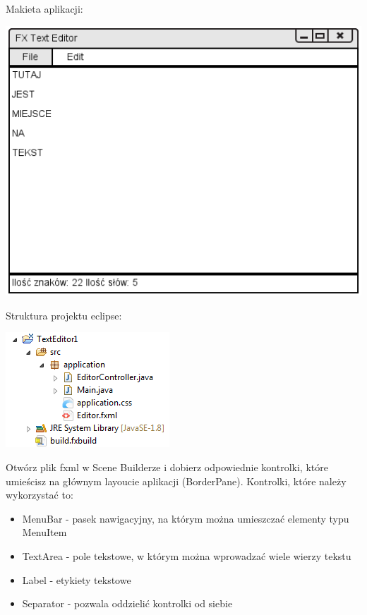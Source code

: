 \documentclass[letterpaper,10pt,english]{sphinxmanual}
\begin{document}
Makieta aplikacji:

{\hfill\includegraphics{mockup.png}\hfill}

Struktura projektu eclipse:

{\hfill\includegraphics{texteditor.png}\hfill}

Otwórz plik fxml w Scene Builderze i dobierz odpowiednie kontrolki, które umieścisz na głównym layoucie aplikacji (BorderPane). Kontrolki, które należy wykorzystać to:
\begin{itemize}
\item {} 
MenuBar - pasek nawigacyjny, na którym można umieszczać elementy typu MenuItem

\item {} 
TextArea - pole tekstowe, w którym można wprowadzać wiele wierzy tekstu

\item {} 
Label - etykiety tekstowe

\item {} 
Separator - pozwala oddzielić kontrolki od siebie

\end{itemize}
\end{document}
